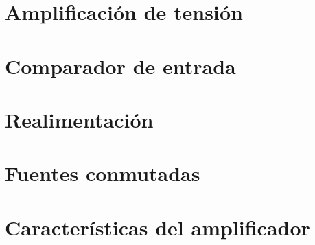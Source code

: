 \documentclass[10pt,a4paper]{article}
\begin{document}
		\section{Amplificación de tensión}
			

		\section{Comparador de entrada}
			

		\section{Realimentación}
			

		\section{Fuentes conmutadas}
			

		\section{Características del amplificador}
			
						
\end{document}
